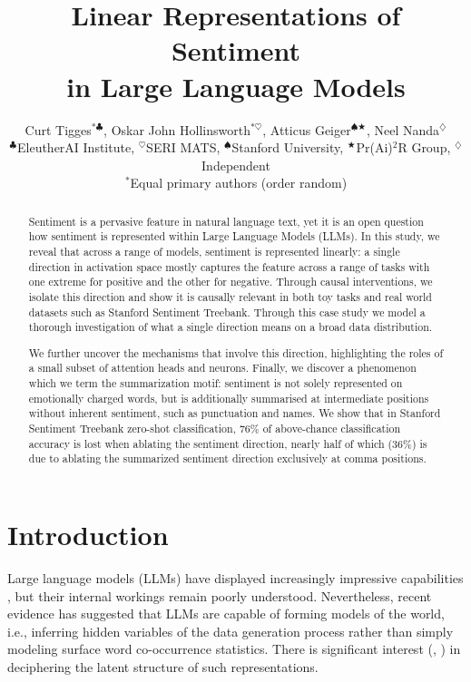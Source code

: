 \documentclass{article} %
\title{Linear Representations of Sentiment\\ in Large Language Models}
\author{
Curt Tigges$^{\text{*}\clubsuit}$, 
Oskar John Hollinsworth$^{\text{*}\heartsuit}$, 
Atticus Geiger$^{\spadesuit \bigstar}$, 
Neel Nanda$^{\diamondsuit}$ \\
$^{\clubsuit}$EleutherAI Institute,
$^{\heartsuit}$SERI MATS,
$^{\spadesuit}$Stanford University,
$^{\bigstar}$Pr(Ai)$^2$R Group,
$^{\diamondsuit}$Independent \\
$^{\text{*}}$Equal primary authors (order random)
}
\begin{document}
\maketitle

\begin{abstract}
Sentiment is a pervasive feature in natural language text, yet it is an open question how sentiment is represented within Large Language Models (LLMs). In this study, we reveal that across a range of models, sentiment is represented linearly: a single direction in activation space mostly captures the feature across a range of tasks with one extreme for positive and the other for negative. Through causal interventions, we isolate this direction and show it is causally relevant in both toy tasks and real world datasets such as Stanford Sentiment Treebank. Through this case study we model a thorough investigation of what a single direction means on a broad data distribution.

We further uncover the mechanisms that involve this direction, highlighting the roles of a small subset of attention heads and neurons. Finally, we discover a phenomenon which we term the summarization motif: sentiment is not solely represented on emotionally charged words, but is additionally summarised at intermediate positions without inherent sentiment, such as punctuation and names. We show that in Stanford Sentiment Treebank zero-shot classification, 76\% of above-chance classification accuracy is lost when ablating the sentiment direction, nearly half of which (36\%) is due to ablating the summarized sentiment direction exclusively at comma positions.


\end{abstract}

\section{Introduction}\label{introduction}
Large language models (LLMs) have displayed increasingly impressive capabilities \citep{brown2020language,radford2019language,bubeck2023sparks}, but their internal workings remain poorly understood. Nevertheless, recent evidence \citep{li2023emergent} has suggested that LLMs are capable of forming models of the world, i.e., inferring hidden variables of the data generation process rather than simply modeling surface word co-occurrence statistics. There is significant interest (\citet{christiano2021eliciting}, \citet{burns2022discovering}) in deciphering the latent structure of such representations.
\end{document}
